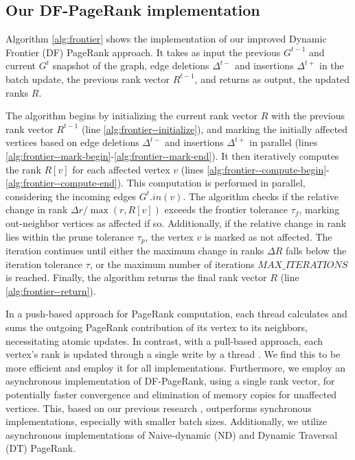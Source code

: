 \subsection{Our DF-PageRank implementation}

Algorithm \ref{alg:frontier} shows the implementation of our improved Dynamic Frontier (DF) PageRank approach. It takes as input the previous $G^{t-1}$ and current $G^t$ snapshot of the graph, edge deletions $\Delta^{t-}$ and insertions $\Delta^{t+}$ in the batch update, the previous rank vector $R^{t-1}$, and returns as output, the updated ranks $R$.

The algorithm begins by initializing the current rank vector $R$ with the previous rank vector $R^{t-1}$ (line \ref{alg:frontier--initialize}), and marking the initially affected vertices based on edge deletions $\Delta^{t-}$ and insertions $\Delta^{t+}$ in parallel (lines \ref{alg:frontier--mark-begin}-\ref{alg:frontier--mark-end}). It then iteratively computes the rank $R[v]$ for each affected vertex $v$ (lines \ref{alg:frontier--compute-begin}-\ref{alg:frontier--compute-end}). This computation is performed in parallel, considering the incoming edges $G^t.in(v)$. The algorithm checks if the relative change in rank $\Delta r / \max(r, R[v])$ exceeds the frontier tolerance $\tau_f$, marking out-neighbor vertices as affected if so. Additionally, if the relative change in rank lies within the prune tolerance $\tau_p$, the vertex $v$ is marked as not affected. The iteration continues until either the maximum change in ranks $\Delta R$ falls below the iteration tolerance $\tau$, or the maximum number of iterations $MAX\_ITERATIONS$ is reached. Finally, the algorithm returns the final rank vector $R$ (line \ref{alg:frontier--return}).

In a push-based approach for PageRank computation, each thread calculates and sums the outgoing PageRank contribution of its vertex to its neighbors, necessitating atomic updates. In contrast, with a pull-based approach, each vertex's rank is updated through a single write by a thread \cite{verstraaten2015quantifying}. We find this to be more efficient and employ it for all implementations. Furthermore, we employ an asynchronous implementation of DF-PageRank, using a single rank vector, for potentially faster convergence and elimination of memory copies for unaffected vertices. This, based on our previous research \cite{sahu2024incrementally}, outperforms synchronous implementations, especially with smaller batch sizes. Additionally, we utilize asynchronous implementations of Naive-dynamic (ND) and Dynamic Traversal (DT) PageRank.




